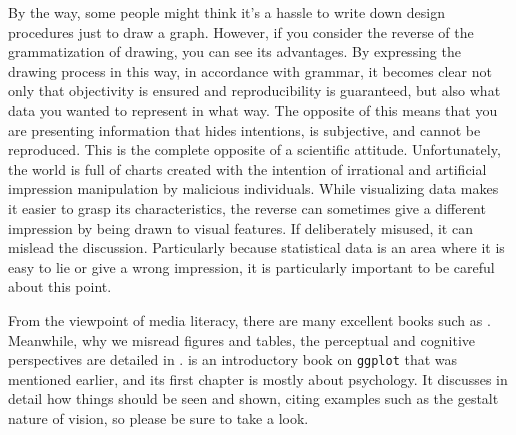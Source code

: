 \documentclass{ltjsbook}
\begin{document}
By the way, some people might think it's a hassle to write down design procedures just to draw a graph. However, if you consider the reverse of the grammatization of drawing, you can see its advantages. By expressing the drawing process in this way, in accordance with grammar, it becomes clear not only that objectivity is ensured and reproducibility is guaranteed, but also what data you wanted to represent in what way. The opposite of this means that you are presenting information that hides intentions, is subjective, and cannot be reproduced. This is the complete opposite of a scientific attitude. Unfortunately, the world is full of charts created with the intention of irrational and artificial impression manipulation by malicious individuals. While visualizing data makes it easier to grasp its characteristics, the reverse can sometimes give a different impression by being drawn to visual features. If deliberately misused, it can mislead the discussion. Particularly because statistical data is an area where it is easy to lie or give a wrong impression, it is particularly important to be careful about this point.

From the viewpoint of media literacy, there are many excellent books such as \textcite{Takagi196807}.
Meanwhile, why we misread figures and tables, the perceptual and cognitive perspectives are detailed in \textcite{Kieran2018}.
\textcite{Kieran2018} is an introductory book on \texttt{ggplot} that was mentioned earlier, and its first chapter is mostly about psychology.
It discusses in detail how things should be seen and shown, citing examples such as the gestalt nature of vision, so please be sure to take a look.
\end{document}
